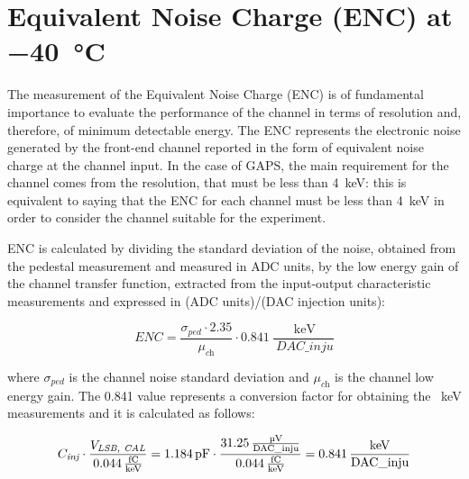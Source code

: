 
\section{Equivalent Noise Charge (ENC) at \SI{-40}{\celsius}} \label{ENC} %
The measurement of the Equivalent Noise Charge (ENC) is of fundamental importance to evaluate the performance of the channel in terms of resolution and, therefore, of minimum detectable energy. The ENC represents the electronic noise generated by the front-end channel reported in the form of equivalent noise charge at the channel input. In the case of GAPS, the main requirement for the channel comes from the resolution, that must be less than \SI{4}{\kilo\electronvolt}: this is equivalent to saying that the ENC for each channel must be less than \SI{4}{\kilo\electronvolt} in order to consider the channel suitable for the experiment.

\par
ENC is calculated by dividing the standard deviation of the noise, obtained from the pedestal measurement and measured in ADC units, by the low energy gain of the channel transfer function, extracted from the input-output characteristic measurements and expressed in (ADC units)/(DAC injection units):

\begin{equation}
    ENC = \frac{\sigma_{\textit{ped}} \cdot 2.35}{\mu_{\textit{ch}}} \cdot \SI{0.841}{\frac{\SI{}{\kilo\electronvolt}}{\SI{}{DAC\_inju}}} 
\end{equation}

\noindent
where $\sigma_{\textit{ped}}$ is the channel noise standard deviation and $\mu_{\textit{ch}}$ is the channel low energy gain. The \SI{0.841}{} value represents a conversion factor for obtaining the \SI{}{\kilo\electronvolt} measurements and it is calculated as follows:

\begin{equation}
    C_{\textit{inj}} \cdot \frac{V_{\textit{LSB, CAL}}}{\SI{0.044}{\frac{fC}{\kilo\electronvolt}}} = \SI{1.184}{\pico\farad} \cdot \frac{\SI{31.25}{\frac{\micro\volt}{DAC\_inju}}}{\SI{0.044}{\frac{fC}{\kilo\electronvolt}}} = \SI{0.841}{\frac{\kilo\electronvolt}{DAC\_inju}}
    \label{eqConversionFactor}
\end{equation}

